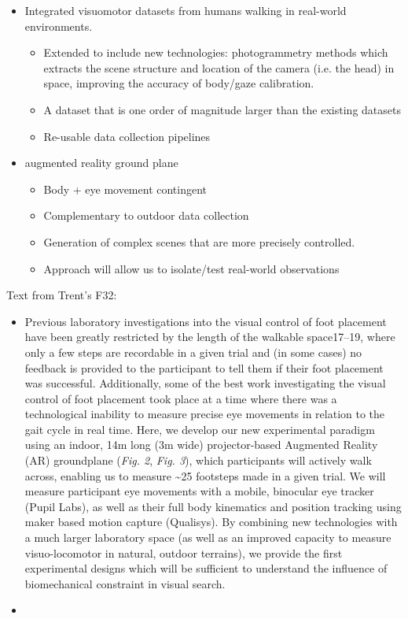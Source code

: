 \begin{itemize}
\item
  Integrated visuomotor datasets from humans walking in real-world
  environments.

  \begin{itemize}
  \item
    Extended to include new technologies: photogrammetry methods which
    extracts the scene structure and location of the camera (i.e. the
    head) in space, improving the accuracy of body/gaze calibration.
  \item
    A dataset that is one order of magnitude larger than the existing
    datasets
  \item
    Re-usable data collection pipelines
  \end{itemize}
\item
  augmented reality ground plane

  \begin{itemize}
  \item
    Body + eye movement contingent
  \item
    Complementary to outdoor data collection
  \item
    Generation of complex scenes that are more precisely controlled.
  \item
    Approach will allow us to isolate/test real-world observations
  \end{itemize}
\end{itemize}

Text from Trent's F32:

\begin{itemize}
\item
  Previous laboratory investigations into the visual control of foot
  placement have been greatly restricted by the length of the walkable
  space17--19, where only a few steps are recordable in a given trial
  and (in some cases) no feedback is provided to the participant to tell
  them if their foot placement was successful. Additionally, some of the
  best work investigating the visual control of foot placement took
  place at a time where there was a technological inability to measure
  precise eye movements in relation to the gait cycle in real time.
  Here, we develop our new experimental paradigm using an indoor, 14m
  long (3m wide) projector-based Augmented Reality (AR) groundplane
  (\emph{Fig. 2}, \emph{Fig. 3}), which participants will actively walk
  across, enabling us to measure \textasciitilde25 footsteps made in a
  given trial. We will measure participant eye movements with a mobile,
  binocular eye tracker (Pupil Labs), as well as their full body
  kinematics and position tracking using maker based motion capture
  (Qualisys). By combining new technologies with a much larger
  laboratory space (as well as an improved capacity to measure
  visuo-locomotor in natural, outdoor terrains), we provide the first
  experimental designs which will be sufficient to understand the
  influence of biomechanical constraint in visual search.
\end{itemize}

\begin{itemize}
\tightlist
\item
\end{itemize}
